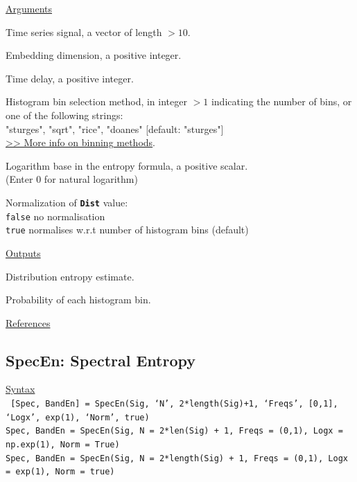 \documentclass[12pt, a4paper, titlepage, openany]{book}
\begin{document}
\noindent \ul{Arguments}
\begin{description}[labelsep=1cm, labelwidth=2cm, nosep, style=multiline,leftmargin=3cm]\footnotesize
\item[\texttt{Sig}]		Time series signal, a vector of length $> 10$.
\item[\texttt{m}]		Embedding dimension, a positive integer.
\item[\texttt{tau}]		Time delay, a positive integer.
\item[\texttt{Bins}]	Histogram bin selection method, in integer $> 1$ indicating the number of bins, 
						or one of the following strings:\\
   					    "sturges", "sqrt", "rice", "doanes" \hspace{2em} [default: "sturges"]				    
\\ \href{https://en.wikipedia.org/wiki/Histogram#Number_of_bins_and_width}{>> More info on binning methods}.
\item[\texttt{Logx}]	Logarithm base in the entropy formula, a positive scalar.\\
						(Enter 0 for natural logarithm)
\item[\texttt{Norm}]	Normalization of \texttt{\textbf{Dist}} value:\\
		  \texttt{false} \hspace{10pt} no normalisation \\
		  \texttt{true} \hspace{15pt} normalises w.r.t number of histogram bins (default)
\end{description}

\noindent \ul{Outputs}
\begin{description}[labelsep=1cm, labelwidth=2cm, nosep, style=multiline,leftmargin=3cm]\footnotesize
\item[\texttt{Dist}]		Distribution entropy estimate.
\item[\texttt{Phi}]		Probability of each histogram bin.
\end{description}

\noindent \ul{References}\hspace{1cm}
\cite{Dist1}



\newpage
\subsection{\normalsize SpecEn: \hspace{15mm} Spectral Entropy}
\noindent\ul{Syntax} \vspace{6mm} \\ \noindent \texttt{\footnotesize
[Spec, BandEn] = SpecEn(Sig, ‘N’, 2*length(Sig)+1, ‘Freqs’, [0,1], ‘Logx’, exp(1), ‘Norm’, true)\\
 Spec, BandEn  = SpecEn(Sig, N = 2*len(Sig) + 1, Freqs = (0,1), Logx = np.exp(1), Norm = True)\\ 
 Spec, BandEn  = SpecEn(Sig, N = 2*length(Sig) + 1, Freqs = (0,1), Logx = exp(1), Norm = true)}
\end{document}
